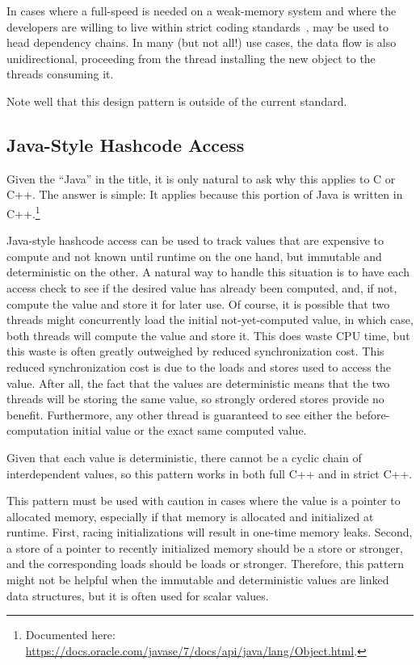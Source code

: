 \documentclass[10]{article}
\begin{document}
In cases where a full-speed  is needed on a
weak-memory system and where the developers are willing to live within
strict coding standards~\cite{PaulEMcKenney2014rcu-dereference},
 may be used to head dependency chains.
In many (but not all!) use cases, the data flow is also unidirectional,
proceeding from the thread installing the new object to the threads
consuming it.

Note well that this design pattern is outside of the current standard.

\subsection{Java-Style Hashcode Access}
\label{sec:Java-Style Hashcode Access}

Given the ``Java'' in the title, it is only natural to ask why this
applies to C or C++.
The answer is simple:
It applies because this portion of Java is written in C++.\footnote{
	Documented here:
	\url{https://docs.oracle.com/javase/7/docs/api/java/lang/Object.html}.}

Java-style hashcode access can be used to track values that are expensive
to compute and not known until runtime on the one hand, but immutable
and deterministic on the other.
A natural way to handle this situation is to have each access check
to see if the desired value has already been computed, and, if not,
compute the value and store it for later use.
Of course, it is possible that two threads might concurrently load
the initial not-yet-computed value, in which case, both threads
will compute the value and store it.
This does waste CPU time, but this waste is often greatly outweighed by
reduced synchronization cost.
This reduced synchronization cost is due to the 
loads and stores used to access the value.
After all, the fact that the values are deterministic means that
the two threads will be storing the same value, so strongly ordered
stores provide no benefit.
Furthermore, any other thread is guaranteed to see either the
before-computation initial value or the exact same computed value.

Given that each value is deterministic, there cannot be a cyclic chain
of interdependent values, so this pattern works in both full C++ and in
strict C++.

This pattern must be used with caution in cases where the value is
a pointer to allocated memory, especially if that memory is allocated
and initialized at runtime.
First, racing initializations will result in one-time memory leaks.
Second, a store of a pointer to recently initialized memory should
be a  store or stronger, and the corresponding
loads should be  loads or stronger.
Therefore, this pattern might not be helpful when the immutable and
deterministic values are linked data structures, but it is often used
for scalar values.
\end{document}
